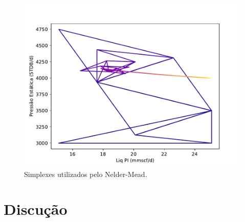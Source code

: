 \begin{figure}
\centering
  \includegraphics[width=0.7\linewidth]{figs/triangles_neldermead.pdf}
  \caption{Simplexes utilizados pelo Nelder-Mead.}
  \label{fig:setup3_triang}
\end{figure}




\section{Discução}





